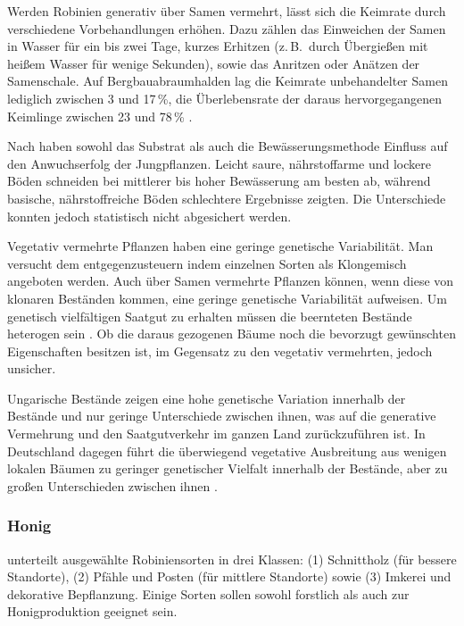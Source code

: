 \documentclass[twocolumn]{scrartcl}
\begin{document}
Werden Robinien generativ über Samen vermehrt, lässt sich die Keimrate
durch verschiedene Vorbehandlungen erhöhen. Dazu zählen das Einweichen
der Samen in Wasser für ein bis zwei Tage, kurzes Erhitzen
(z.\,B.\ durch Übergießen mit heißem Wasser für wenige Sekunden),
sowie das Anritzen oder Anätzen der Samenschale. Auf
Bergbauabraumhalden lag die Keimrate unbehandelter Samen lediglich
zwischen 3 und 17\,\%, die Überlebensrate der daraus hervorgegangenen
Keimlinge zwischen 23 und 78\,\% \citep{limstrom1949robinie}.

Nach \citet{draghici2024robinie} haben sowohl das Substrat als auch
die Bewässerungsmethode Einfluss auf den Anwuchserfolg der
Jungpflanzen. Leicht saure, nährstoffarme und lockere Böden schneiden
bei mittlerer bis hoher Bewässerung am besten ab, während basische,
nährstoffreiche Böden schlechtere Ergebnisse zeigten. Die Unterschiede
konnten jedoch statistisch nicht abgesichert werden.

Vegetativ vermehrte Pflanzen haben eine geringe genetische
Variabilität.  Man versucht dem entgegenzusteuern indem einzelnen
Sorten als Klongemisch angeboten werden. Auch über Samen vermehrte
Pflanzen können, wenn diese von klonaren Beständen kommen, eine
geringe genetische Variabilität aufweisen.  Um genetisch vielfältigen
Saatgut zu erhalten müssen die beernteten Bestände heterogen sein
\citep{pakull2024robinieKlon}. Ob die daraus gezogenen Bäume noch die
bevorzugt gewünschten Eigenschaften besitzen ist, im Gegensatz zu den
vegetativ vermehrten, jedoch unsicher.

Ungarische Bestände zeigen eine hohe genetische Variation innerhalb
der Bestände und nur geringe Unterschiede zwischen ihnen, was auf die
generative Vermehrung und den Saatgutverkehr im ganzen Land
zurückzuführen ist. In Deutschland dagegen führt die überwiegend
vegetative Ausbreitung aus wenigen lokalen Bäumen zu geringer
genetischer Vielfalt innerhalb der Bestände, aber zu großen
Unterschieden zwischen ihnen \citep{liesebach2011robinie}.

\subsubsection{Honig}

\citet{keresztesi1983robinie} unterteilt ausgewählte Robiniensorten in drei Klassen: 
(1) Schnittholz (für bessere Standorte), 
(2) Pfähle und Posten (für mittlere Standorte) sowie 
(3) Imkerei und dekorative Bepflanzung. 
Einige Sorten sollen sowohl forstlich als auch zur Honigproduktion geeignet sein.
\end{document}
